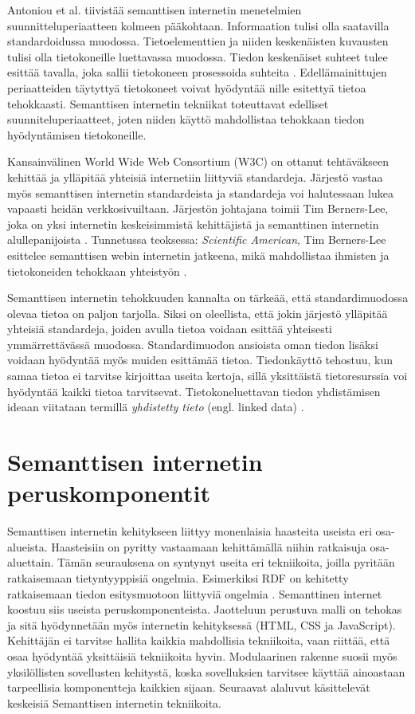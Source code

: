 \documentclass[finnish, 12pt, a4paper, elec, utf8, pdfa, online]{aaltothesis}
\begin{document}
Antoniou et al. tiivistää semanttisen internetin menetelmien suunnitteluperiaatteen kolmeen pääkohtaan. Informaation tulisi olla saatavilla standardoidussa muodossa. Tietoelementtien ja niiden keskenäisten kuvausten tulisi olla tietokoneille luettavassa muodossa. Tiedon keskenäiset suhteet tulee esittää tavalla, joka sallii tietokoneen prosessoida suhteita \cite{Antoniou}. Edellämainittujen periaatteiden täytyttyä tietokoneet voivat hyödyntää nille esitettyä tietoa tehokkaasti. Semanttisen internetin tekniikat toteuttavat edelliset suunniteluperiaatteet, joten niiden käyttö mahdollistaa tehokkaan tiedon hyödyntämisen tietokoneille.

Kansainvälinen World Wide Web Consortium (W3C) on ottanut tehtäväkseen kehittää ja ylläpitää yhteisiä internetiin liittyviä standardeja. Järjestö vastaa myös semanttisen internetin standardeista ja standardeja voi halutessaan lukea vapaasti heidän verkkosivuiltaan. Järjestön johtajana toimii Tim Berners-Lee, joka on yksi internetin keskeisimmistä kehittäjistä ja semanttinen internetin alullepanijoista \cite{W3C}. Tunnetussa teoksessa: \textit{Scientific American}, Tim Berners-Lee esittelee semanttisen webin internetin jatkeena, mikä mahdollistaa ihmisten ja tietokoneiden tehokkaan yhteistyön \cite{Berners_visio}.

Semanttisen internetin tehokkuuden kannalta on tärkeää, että standardimuodossa olevaa tietoa on paljon tarjolla. Siksi on oleellista, että jokin järjestö ylläpitää yhteisiä standardeja, joiden avulla tietoa voidaan esittää yhteisesti ymmärrettävässä muodossa. Standardimuodon ansioista oman tiedon lisäksi voidaan hyödyntää myös muiden esittämää tietoa. Tiedonkäyttö tehostuu, kun samaa tietoa ei tarvitse kirjoittaa useita kertoja, sillä yksittäistä tietoresurssia voi hyödyntää kaikki tietoa tarvitsevat. Tietokoneluettavan tiedon yhdistämisen ideaan viitataan termillä \textit{yhdistetty tieto} (engl. linked data) \cite{linked_w3c} \cite{linked_data_finlad}.

\clearpage
\section{Semanttisen internetin peruskomponentit}
Semanttisen internetin kehitykseen liittyy monenlaisia haasteita useista eri osa-alueista. Haasteisiin on pyritty vastaamaan kehittämällä niihin ratkaisuja osa-aluettain. Tämän seurauksena on syntynyt useita eri tekniikoita, joilla pyritään ratkaisemaan tietyntyyppisiä ongelmia. Esimerkiksi RDF on kehitetty ratkaisemaan tiedon esitysmuotoon liittyviä ongelmia \cite{RDF_specification}. Semanttinen internet koostuu siis useista peruskomponenteista. Jaotteluun perustuva malli on tehokas ja sitä hyödynnetään myös internetin kehityksessä (HTML, CSS ja JavaScript). Kehittäjän ei tarvitse hallita kaikkia mahdollisia tekniikoita, vaan riittää, että osaa hyödyntää yksittäisiä tekniikoita hyvin. Modulaarinen rakenne suosii myös yksilöllisten sovellusten kehitystä, koska sovelluksien tarvitsee käyttää ainoastaan tarpeellisia komponentteja kaikkien sijaan. Seuraavat alaluvut käsittelevät keskeisiä Semanttisen internetin tekniikoita.
\end{document}
